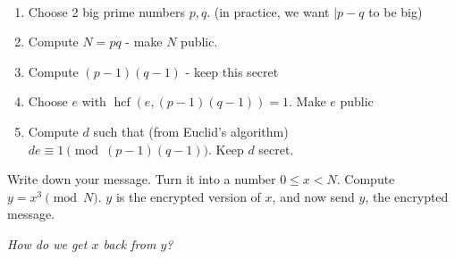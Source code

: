 \documentclass[10pt]{scrartcl}
\DeclareMathOperator{\hcf}{hcf}
\begin{document}
\begin{proc}~\\[-.25cm]
\begin{enumerate}
\item Choose 2 big prime numbers $p,q$. (in practice, we want $|p-q$ to be big)
\item Compute $N = pq$ - make $N$ public. 
\item Compute $(p-1)(q-1)$ - keep this secret
\item Choose $e$ with $\hcf(e,(p-1)(q-1)) = 1$. Make $e$ public
\item Compute $d$ such that (from Euclid's algorithm) $de \equiv 1 \pmod{(p-1)(q-1)}$. Keep $d$ secret. 
\end{enumerate}	
\end{proc}

Write down your message. Turn it into a number $0 \leq x < N$. Compute $y= x^3 \pmod{N}$. $y$ is the encrypted version of $x$, and now send $y$, the encrypted message. 

\emph{How do we get $x$ back from $y$?}\\
\end{document}
